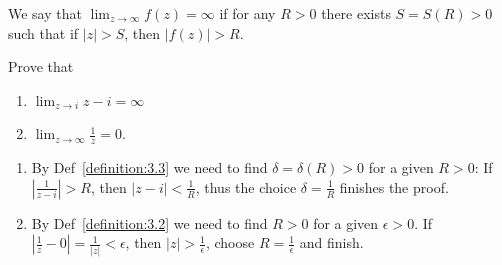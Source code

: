 \begin{definition}\label{definition:3.4}
    We say that $\lim_{z \to \infty} f(z) = \infty$ if for any $R > 0$ there exists $S = S(R) > 0$ such that if $|z| > S$, then $|f(z)| > R$.
\end{definition}

\begin{example}\label{example:5.5} Prove that 
    \begin{enumerate}[label=\alph*)] 
        \item $\lim_{z \to i} z - i = \infty$ 
        \item $\lim_{z \to \infty} \frac{1}{z} = 0$.
    \end{enumerate}

\begin{soln} 
    \begin{enumerate}[label=\alph*)] 
        \item By Def~\ref{definition:3.3}  we need to find $\delta = \delta(R) > 0$ for a given $R > 0$: If $\left|\frac{1}{z-i}\right| > R$, then $|z - i| < \frac{1}{R}$, thus the choice $\delta = \frac{1}{R}$ finishes the proof.
\item By Def~\ref{definition:3.2} we need to find $R > 0$ for a given $\epsilon > 0$. If $\left|\frac{1}{z} - 0\right| = \frac{1}{|z|} < \epsilon$, then $|z| > \frac{1}{\epsilon}$, choose $R = \frac{1}{\epsilon}$ and finish.
    \end{enumerate}
\end{soln}
\end{example}

